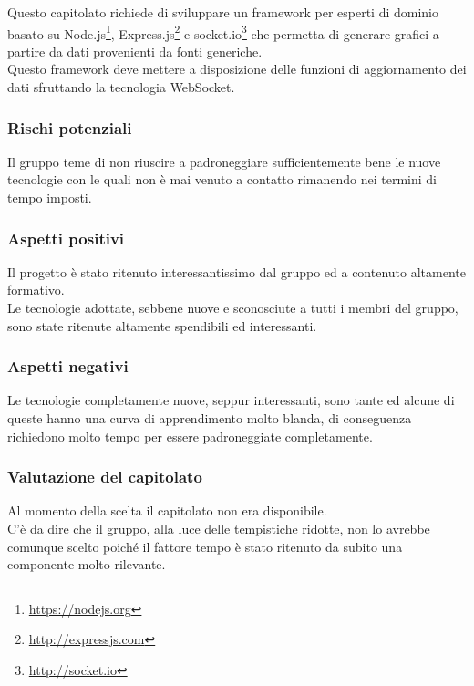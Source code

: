 Questo capitolato richiede di sviluppare un framework per esperti di dominio basato su Node.js\footnote{\url{https://nodejs.org}}, Express.js\footnote{\url{http://expressjs.com}} e socket.io\footnote{\url{http://socket.io}} che permetta di generare grafici a partire da dati provenienti da fonti generiche. \\
Questo framework deve mettere a disposizione delle funzioni di aggiornamento dei dati sfruttando la tecnologia WebSocket.
\subsubsection{Rischi potenziali} 
Il gruppo teme di non riuscire a padroneggiare sufficientemente bene le nuove tecnologie con le quali non è mai venuto a contatto rimanendo nei termini di tempo imposti.
\subsubsection{Aspetti positivi}
Il progetto è stato ritenuto interessantissimo dal gruppo ed a contenuto altamente formativo. \\
Le tecnologie adottate, sebbene nuove e sconosciute a tutti i membri del gruppo, sono state ritenute altamente spendibili ed interessanti.
\subsubsection{Aspetti negativi}
Le tecnologie completamente nuove, seppur interessanti, sono tante ed alcune di queste hanno una curva di apprendimento molto blanda, di conseguenza richiedono molto tempo per essere padroneggiate completamente.
\subsubsection{Valutazione del capitolato}
Al momento della scelta il capitolato non era disponibile.\\ C’è da dire che il gruppo, alla luce delle tempistiche ridotte, non lo avrebbe comunque scelto poiché il fattore tempo è stato ritenuto da subito una componente molto rilevante.

